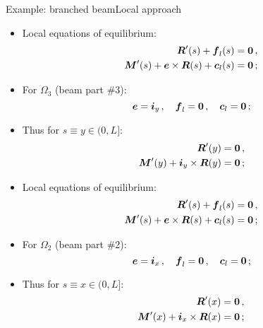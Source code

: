 \documentclass{beamer}
\newcommand{\cj}{c}
\newcommand{\cv}{{\boldsymbol\cj}}
\newcommand{\xj}{x}
\newcommand{\yj}{y}
\newcommand{\ej}{e}
\renewcommand{\ij}{i}
\newcommand{\ev}{{\boldsymbol\ej}}
\newcommand{\iv}{{\boldsymbol\ij}}
\newcommand{\medium}{\Omega}
\newcommand{\fj}{f}
\newcommand{\fv}{{\boldsymbol\fj}}
\newcommand{\Fresj}{R}
\newcommand{\Mresj}{M}
\newcommand{\Fres}{{\boldsymbol\Fresj}}
\newcommand{\Mres}{{\boldsymbol\Mresj}}
\newcommand{\bzero}{{\bf 0}}
\begin{document}
\begin{frame}{Example: branched beam}{Local approach}

\begin{overprint}

\begin{itemize}
\item Local equations of equilibrium:
\begin{displaymath}
\begin{split}
\Fres'(s)+\fv_l(s) &=\bzero\,, \\
\Mres'(s)+\ev\times\Fres(s)+\cv_l(s) &=\bzero\,;
\end{split}
\end{displaymath}
\item For $\medium_3$ (beam part \#3):
\begin{displaymath} 
\ev=\iv_\yj\,,\quad\fv_l=\bzero\,,\quad\cv_l=\bzero\,;
\end{displaymath}
\item Thus for $s\equiv\yj\in(0,L]$:
\begin{displaymath}
\begin{split}
\Fres'(\yj) &=\bzero\,, \\
\Mres'(\yj)+\iv_\yj\times\Fres(\yj) &=\bzero\,;
\end{split}
\end{displaymath}
\end{itemize}

\begin{itemize}
\item Local equations of equilibrium:
\begin{displaymath}
\begin{split}
\Fres'(s)+\fv_l(s) &=\bzero\,, \\
\Mres'(s)+\ev\times\Fres(s)+\cv_l(s) &=\bzero\,;
\end{split}
\end{displaymath}
\item For $\medium_2$ (beam part \#2):
\begin{displaymath} 
\ev=\iv_\xj\,,\quad\fv_l=\bzero\,,\quad\cv_l=\bzero\,;
\end{displaymath}
\item Thus for $s\equiv\xj\in(0,L]$:
\begin{displaymath}
\begin{split}
\Fres'(\xj) &=\bzero\,, \\
\Mres'(\xj)+\iv_\xj\times\Fres(\xj) &=\bzero\,;
\end{split}
\end{displaymath}
\end{itemize}


\end{overprint}
\end{frame}
\end{document}
